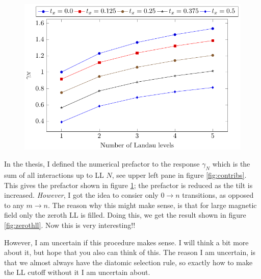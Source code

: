 \documentclass{scrarticle}
\begin{document}
\begin{figure}[p]
  \centering
  \includegraphics[width=\textwidth]{../Thesis/figures/external/contribtx}
  \caption{\label{fig:contribN}}
\end{figure}

In the thesis, I defined the numerical prefactor to the response \( \gamma_N \) which is the sum of all interactions up to LL \( N \), see upper left pane in figure \ref{fig:contribs}.
This gives the prefactor shown in figure \ref{fig:contribN};
the prefactor is reduced as the tilt is increased.
\emph{However}, I got the idea to consier only \( 0\to n \) transitions, as opposed to any \( m\to n \).
The reason why this might make sense, is that for large magnetic field only the zeroth LL is filled.
Doing this, we get the result shown in figure \ref{fig:zerothll}.
Now this is very interesting!!

However, I am uncertain if this procedure makes sense.
I will think a bit more about it, but hope that you also can think of this.
The reason I am uncertain, is that we almost always have the diatomic selection rule, so exactly how to make the LL cutoff without it I am uncertain about.
\end{document}
